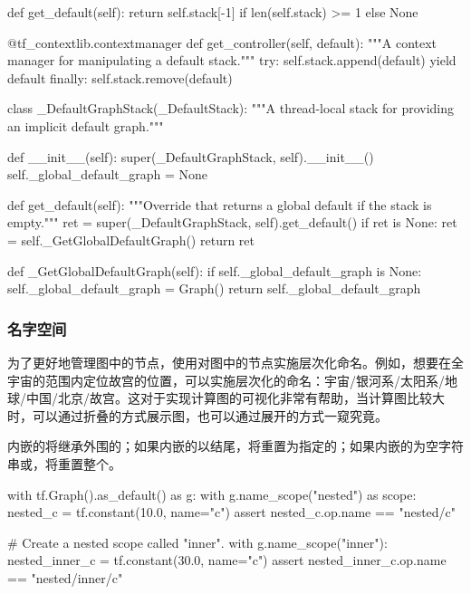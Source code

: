 \begin{content}
\begin{leftbar}
\begin{python}
  def get_default(self):
    return self.stack[-1] if len(self.stack) >= 1 else None

  @tf_contextlib.contextmanager
  def get_controller(self, default):
    """A context manager for manipulating a default stack."""
    try:
      self.stack.append(default)
      yield default
    finally:
      self.stack.remove(default)

class _DefaultGraphStack(_DefaultStack):
  """A thread-local stack for providing an implicit default graph."""

  def __init__(self):
    super(_DefaultGraphStack, self).__init__()
    self._global_default_graph = None

  def get_default(self):
    """Override that returns a global default if the stack is empty."""
    ret = super(_DefaultGraphStack, self).get_default()
    if ret is None:
      ret = self._GetGlobalDefaultGraph()
    return ret

  def _GetGlobalDefaultGraph(self):
    if self._global_default_graph is None:
      self._global_default_graph = Graph()
    return self._global_default_graph
\end{python}
\end{leftbar}

\subsubsection{名字空间}

为了更好地管理图中的节点，使用对图中的节点实施层次化命名。例如，想要在全宇宙的范围内定位故宫的位置，可以实施层次化的命名：宇宙/银河系/太阳系/地球/中国/北京/故宫。这对于实现计算图的可视化非常有帮助，当计算图比较大时，可以通过折叠的方式展示图，也可以通过展开的方式一窥究竟。

内嵌的将继承外围的；如果内嵌的以\code{/}结尾，将重置为指定的；如果内嵌的为空字符串或，将重置整个。

\begin{leftbar}
\begin{python}
with tf.Graph().as_default() as g:
  with g.name_scope("nested") as scope:
    nested_c = tf.constant(10.0, name="c")
    assert nested_c.op.name == "nested/c"

    # Create a nested scope called "inner".
    with g.name_scope("inner"):
      nested_inner_c = tf.constant(30.0, name="c")
      assert nested_inner_c.op.name == "nested/inner/c"


\end{python}
\end{leftbar}
\end{content}
